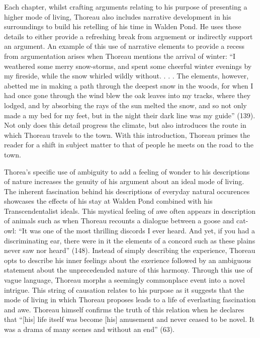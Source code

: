 \documentclass[12pt]{article}
\newcommand{\tq}[2]{
    \fancyhead[L]{\emph{Walden}: Reading Journals}
    \fancyhead[R]{TQ:\ #1 $\vert$ CH: #2}
}
\begin{document}
Each chapter, whilst crafting arguments relating to his purpose of presenting a higher mode of living, Thoreau also includes narrative development in his surroundings to build his retelling of his time in Walden Pond. He uses these details to either provide a refreshing break from arguement or indirectly support an argument. An example of this use of narrative elements to provide a recess from argumentation arises when Thoreau mentions the arrival of winter: ``I weathered some merry snow-storms, and spent some cheerful winter evenings by my fireside, while the snow whirled wildly without. . . . The elements, however, abetted me in making a path through the deepest snow in the woods, for when I had once gone through the wind blew the oak leaves into my tracks, where they lodged, and by absorbing the rays of the sun melted the snow, and so not only made a my bed for my feet, but in the night their dark line was my guide'' (139). Not only does this detail progress the climate, but also introduces the route in which Thoreau travels to the town. With this introduction, Thoreau primes the reader for a shift in subject matter to that of people he meets on the road to the town.

\newpage
\tq{12}{15 - Winter Animals}


Thorea's specific use of ambiguity to add a feeling of wonder to his descriptions of nature increases the genuity of his argument about an ideal mode of living. The inherent fascination behind his descriptions of everyday natural occurences showcases the effects of his stay at Walden Pond combined with his Transcendentalist ideals. This mystical feeling of awe often appears in  description of animals such as when Thoreau recounts a dialogue between a goose and cat-owl: ``It was one of the most thrilling discords I ever heard. And yet, if you had a discriminating ear, there were in it the elements of a concord such as these plains never saw nor heard'' (148). Instead of simply describing the experience, Thoreau opts to describe his inner feelings about the exerience followed by an ambiguous statement about the unprecedended nature of this harmony. Through this use of vague language, Thoreau morphs a seemingly commonplace event into a novel intrigue. This string of causation relates to his purpose as it suggests that the mode of living in which Thoreau proposes leads to a life of everlasting fascination and awe. Thoreau himself confirms the truth of this relation when he declares that ``[his] life itself was become [his] amusement and never ceased to be novel. It was a drama of many scenes and without an end'' (63).
\end{document}
